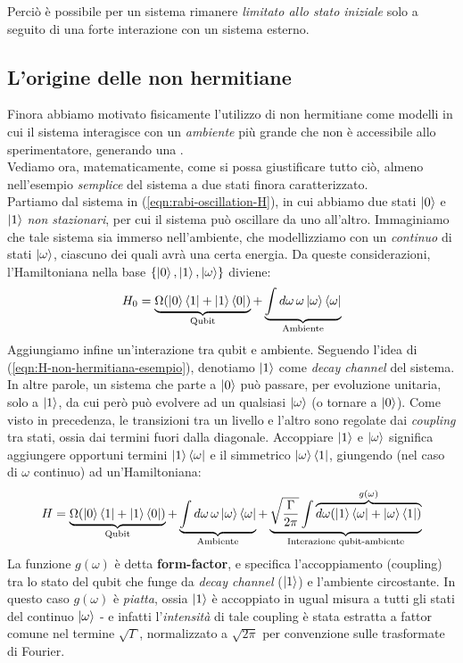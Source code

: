 \documentclass[../../InformazioneQuantistica.tex]{subfiles}
\begin{document}
Perciò è possibile per un sistema rimanere \textit{limitato allo stato iniziale} solo a seguito di una forte interazione con un sistema esterno.

\subsection{L'origine delle  non hermitiane}
Finora abbiamo motivato fisicamente l'utilizzo di  non hermitiane come modelli in cui il sistema interagisce con un \textit{ambiente} più grande che non è accessibile allo sperimentatore, generando una .\\
Vediamo ora, matematicamente, come si possa giustificare tutto ciò, almeno nell'esempio \textit{semplice} del sistema a due stati finora caratterizzato.\\

Partiamo dal sistema in (\ref{eqn:rabi-oscillation-H}), in cui abbiamo due stati $\Ket{0}$ e $\Ket{1}$ \textit{non stazionari}, per cui il sistema può oscillare da uno all'altro. Immaginiamo che tale sistema sia immerso nell'ambiente, che modellizziamo con un \textit{continuo} di stati $\Ket{\omega}$, ciascuno dei quali avrà una certa energia. Da queste considerazioni, l'Hamiltoniana nella base $\{\Ket{0}, \Ket{1},\Ket{\omega}\}$ diviene:
\begin{align*}
H_0=\underbrace{\Omega (\Ket{0}\Bra{1} + \Ket{1}\Bra{0})}_{\text{Qubit}} +\underbrace{\int d\omega\, \omega \Ket{\omega}\Bra{\omega}}_{\text{Ambiente}}
\end{align*}
Aggiungiamo infine un'interazione tra qubit e ambiente. Seguendo l'idea di (\ref{eqn:H-non-hermitiana-esempio}), denotiamo $\Ket{1}$ come \textit{decay channel} del sistema. In altre parole, un sistema che parte a $\Ket{0}$ può passare, per evoluzione unitaria, solo a $\Ket{1}$, da cui però può evolvere ad un qualsiasi $\Ket{\omega}$ (o tornare a $\Ket{0}$). Come visto in precedenza, le transizioni tra un livello e l'altro sono regolate dai \textit{coupling} tra stati, ossia dai termini fuori dalla diagonale. Accoppiare $\Ket{1}$ e $\Ket{\omega}$ significa aggiungere opportuni termini $\Ket{1}\Bra{\omega}$ e il simmetrico $\Ket{\omega}\Bra{1}$, giungendo (nel caso di $\omega$ continuo) ad un'Hamiltoniana:
\begin{align}
H=\underbrace{\Omega (\Ket{0}\Bra{1} + \Ket{1}\Bra{0})}_{\text{Qubit}} +\underbrace{\int d\omega\, \omega \Ket{\omega}\Bra{\omega}}_{\text{Ambiente}} +\underbrace{ \sqrt{\frac{\Gamma}{2\pi}}\int \overbrace{d\omega (\Ket{1}\Bra{\omega}+ \Ket{\omega}\Bra{1})}^{g(\omega)}}_{\text{Interazione qubit-ambiente}}
\label{eqn:hamiltoniana-interagente-totale}
\end{align}
La funzione $g(\omega)$ è detta \textbf{form-factor}, e specifica l'accoppiamento (coupling) tra lo stato del qubit che funge da \textit{decay channel} ($\Ket{1}$) e l'ambiente circostante. In questo caso $g(\omega)$ è \textit{piatta}, ossia $\Ket{1}$ è accoppiato in ugual misura a tutti gli stati del continuo $\Ket{\omega}$ - e infatti l'\textit{intensità} di tale coupling è stata estratta a fattor comune nel termine $\sqrt{\Gamma}$, normalizzato a $\sqrt{2\pi}$ per convenzione sulle trasformate di Fourier.
\end{document}

